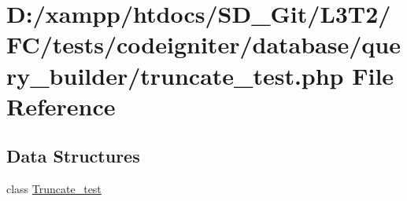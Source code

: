 \hypertarget{truncate__test_8php}{}\section{D\+:/xampp/htdocs/\+S\+D\+\_\+\+Git/\+L3\+T2/\+F\+C/tests/codeigniter/database/query\+\_\+builder/truncate\+\_\+test.php File Reference}
\label{truncate__test_8php}
\subsection*{Data Structures}
\begin{DoxyCompactItemize}
\item 
class \hyperlink{class_truncate__test}{Truncate\+\_\+test}
\end{DoxyCompactItemize}
